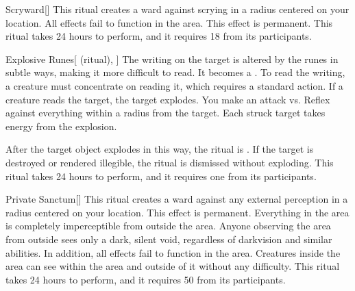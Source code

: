 \lowercase{\hypertarget{spell:Scryward}{}}\label{spell:Scryward}
\begin{freeability}[Rank 3]{\hypertarget{spell:Scryward}{Scryward}}[]
\targetrule
This ritual creates a ward against scrying in a \arealarge radius  centered on your location.
All  effects fail to function in the area.
This effect is permanent.
This ritual takes 24 hours to perform, and it requires 18  from its participants.
\end{freeability}
\vspace{0.25em}



\lowercase{\hypertarget{spell:Explosive Runes}{}}\label{spell:Explosive Runes}
\begin{attuneability}[Rank 4]{\hypertarget{spell:Explosive Runes}{Explosive Runes}}[ (ritual), ]
The writing on the target is altered by the runes in subtle ways, making it more difficult to read.
It becomes a .
To read the writing, a creature must concentrate on reading it, which requires a standard action.
If a creature reads the target, the target explodes.
You make an attack vs. Reflex against everything within a \areamed radius from the target.
Each struck target takes energy  from the explosion.

After the target object explodes in this way, the ritual is .
If the target is destroyed or rendered illegible, the ritual is dismissed without exploding.
This ritual takes 24 hours to perform, and it requires one  from its participants.
\end{attuneability}
\vspace{0.25em}



\lowercase{\hypertarget{spell:Private Sanctum}{}}\label{spell:Private Sanctum}
\begin{freeability}[Rank 5]{\hypertarget{spell:Private Sanctum}{Private Sanctum}}[]
\targetrule
This ritual creates a ward against any external perception in a \arealarge radius  centered on your location.
This effect is permanent.
Everything in the area is completely imperceptible from outside the area.
Anyone observing the area from outside sees only a dark, silent void, regardless of darkvision and similar abilities.
In addition, all  effects fail to function in the area.
Creatures inside the area can see within the area and outside of it without any difficulty.
This ritual takes 24 hours to perform, and it requires 50  from its participants.
\end{freeability}
\vspace{0.25em}




